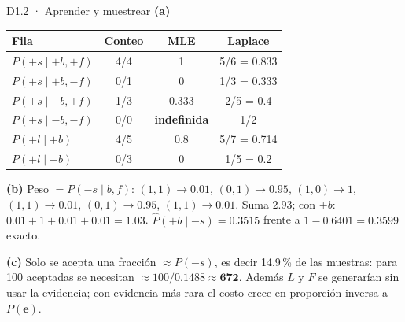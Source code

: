 \begin{solucion}{D1.2 · Aprender y muestrear}
\textbf{(a)}
\begin{center}\small
\begin{tabular}{l|ccc}
Fila & Conteo & MLE & Laplace\\\hline
$P(+s\mid+b,+f)$ & 4/4 & 1 & 5/6 = 0.833\\
$P(+s\mid+b,-f)$ & 0/1 & 0 & 1/3 = 0.333\\
$P(+s\mid-b,+f)$ & 1/3 & 0.333 & 2/5 = 0.4\\
$P(+s\mid-b,-f)$ & 0/0 & \textbf{indefinida} & 1/2\\
$P(+l\mid+b)$ & 4/5 & 0.8 & 5/7 = 0.714\\
$P(+l\mid-b)$ & 0/3 & 0 & 1/5 = 0.2
\end{tabular}
\end{center}

\textbf{(b)} Peso $=P(-s\mid b,f)$: $(1,1)\to0.01$, $(0,1)\to0.95$, $(1,0)\to1$, $(1,1)\to0.01$, $(0,1)\to0.95$, $(1,1)\to0.01$.
Suma $2.93$; con $+b$: $0.01+1+0.01+0.01=1.03$. $\hat P(+b\mid-s)=\mathbf{0.3515}$ frente a $1-0.6401=\mathbf{0.3599}$ exacto.

\textbf{(c)} Solo se acepta una fracción $\approx P(-s)$, es decir 14.9\,\% de las muestras: para 100 aceptadas se necesitan $\approx100/0.1488\approx\mathbf{672}$.
Además $L$ y $F$ se generarían sin usar la evidencia; con evidencia más rara el costo crece en proporción inversa a $P(\mathbf e)$.
\end{solucion}

